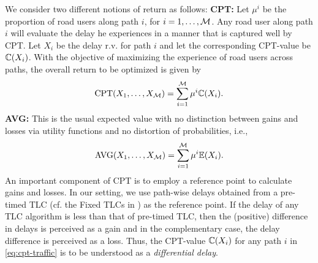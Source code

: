 We consider two different notions of return as follows:
%
\textbf{CPT:} Let $\mu^i$ be the proportion of road users along path $i$, for $i=1,\ldots,\mathcal{M}$. Any road user along path $i$ will evaluate the delay he experiences in a manner that is captured well by CPT. Let $X_i$ be the delay r.v. for path $i$ and let the corresponding CPT-value be $\mathbb{C}(X_i)$. With the objective of maximizing the experience of road users across paths, the overall return to be optimized is given by
\begin{align}
\text{CPT}(X_1,\ldots,X_{\mathcal{M}}) = \sum_{i=1}^{\mathcal{M}} \mu^i \mathbb{C}(X_i).\label{eq:cpt-traffic}
\end{align}
\textbf{AVG:} This is the usual expected value with no distinction between gains and losses via utility functions and no distortion of probabilities, i.e., 
\begin{align}
\text{AVG}(X_1,\ldots,X_{\mathcal{M}}) = \sum_{i=1}^{\mathcal{M}} \mu^i \mathbb{E}(X_i). 
\end{align}
An important component of CPT is to employ a reference point to calculate gains and losses. 
In our setting, we use path-wise delays obtained from a pre-timed TLC (cf. the Fixed TLCs in \cite{prashanth2011reinforcement}) as the reference point. If the delay of any TLC algorithm is less than that of pre-timed TLC, then the (positive) difference in delays is perceived as a gain and in the complementary case, the delay difference is perceived as a loss. Thus, the CPT-value $\mathbb{C}(X_i)$ for any path $i$ in \eqref{eq:cpt-traffic} is to be understood as a \textit{differential delay}.  


